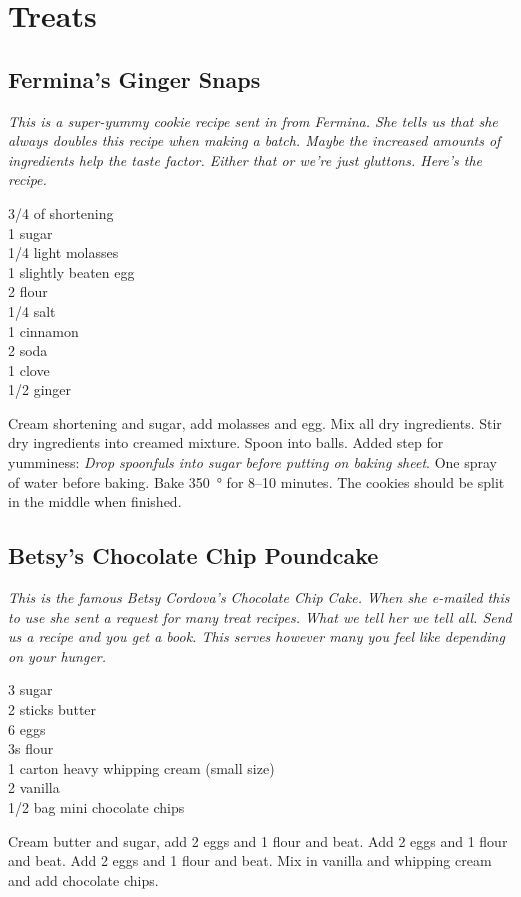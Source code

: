 \chapter{Treats}

\section{Fermina's Ginger Snaps}

\textit{This is a super-yummy cookie recipe sent in from Fermina.  She tells
  us that she always doubles this recipe when making a batch. Maybe the
  increased amounts of ingredients help the taste factor.  Either that or
  we're just gluttons.  Here's the recipe.}
\begin{ingredients}
  \SI{3/4}{\cup} of shortening \\
  \SI{1}{\cup} sugar \\
  \SI{1/4}{\cup} light molasses \\
  1 slightly beaten egg \\
  \SI{2}{\cup} flour \\
  \SI{1/4}{\teaspoon}  salt \\
  \SI{1}{\teaspoon}  cinnamon \\
  \SI{2}{\teaspoon} soda \\
  \SI{1}{\teaspoon}  clove \\
  \SI{1/2}{\teaspoon} ginger
\end{ingredients}
Cream shortening and sugar, add molasses and egg.  Mix all dry ingredients.
Stir dry ingredients into creamed mixture.  Spoon into balls. Added step for
yumminess: \textit{Drop spoonfuls into sugar before putting on baking sheet}.
One spray of water before baking.  Bake \SI{350}{\degree} for \numrange{8}{10}
minutes.  The cookies should be split in the middle when finished.

\section{Betsy's Chocolate Chip Poundcake}

\textit{This is the famous Betsy Cordova's Chocolate Chip Cake. When she
  e-mailed this to use she sent a request for many treat recipes.  What we
  tell her we tell all.  Send us a recipe and you get a book.  This serves
  however many you feel like depending on your hunger.}
\begin{ingredients}
  \SI{3}{\cup} sugar \\
  2 sticks butter \\
  6 eggs \\
  \SI{3}{\cup}s flour  \\
  1 carton heavy whipping cream (small size) \\
  \SI{2}{\tblspoon}  vanilla \\
  \num{1/2} bag mini chocolate chips
\end{ingredients}
Cream butter and sugar, add 2 eggs and \SI{1}{\cup} flour and beat.  Add 2
eggs and \SI{1}{\cup} flour and beat. Add 2 eggs and \SI{1}{\cup} flour and
beat.  Mix in vanilla and whipping cream and add chocolate chips.


